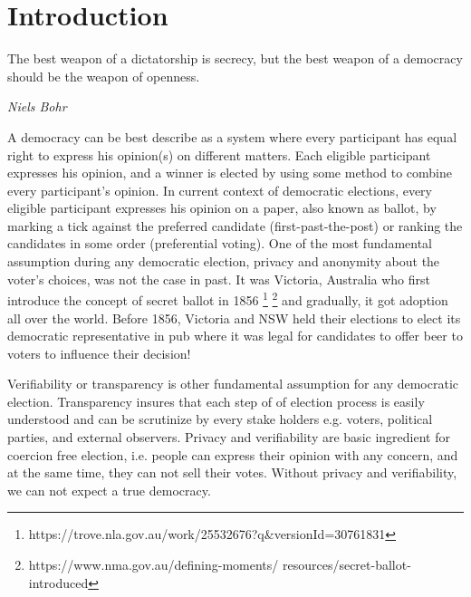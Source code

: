 \chapter{Introduction}
\label{cha:intro}

\epigraph{The best weapon of a dictatorship is secrecy, but the best weapon of a democracy should be the weapon of openness.} 
{\textit{Niels Bohr}} 

%


A democracy can be best describe as a system where every participant 
has equal right to express his opinion(s) on different matters. Each
eligible participant expresses his opinion, and a winner is elected 
by using some method to combine every participant's opinion.
In current context of democratic elections, 
every eligible participant expresses his opinion on a paper, also 
known as ballot, 
by marking a tick against the preferred candidate 
(first-past-the-post) or ranking the candidates in some order
(preferential voting). 
One of the most fundamental assumption during any democratic 
election, privacy and anonymity about the voter's choices, was not the case 
in past. It was Victoria, Australia who first introduce the 
concept of secret ballot in 1856 \footnote{
 https://trove.nla.gov.au/work/25532676?q\&versionId=30761831}
 \footnote{https://www.nma.gov.au/defining-moments/
	  resources/secret-ballot-introduced} and gradually, it 
	  got adoption all over the world. Before 1856, Victoria
	  and NSW held their elections to elect its 
	  democratic representative in pub where it was legal for 
	  candidates to offer beer to voters to influence their 
	  decision! 
	  
Verifiability or transparency is other fundamental assumption for 
any democratic election. Transparency insures that each step of 
of election process is easily understood and can be scrutinize by 
every stake holders e.g. voters, political parties, and external 
observers. Privacy and verifiability  are basic 
ingredient for coercion free election, i.e. people 
can express their opinion with any concern, and at the same time,
they can not sell their votes. Without privacy and verifiability, 
we can not expect a true democracy.   

